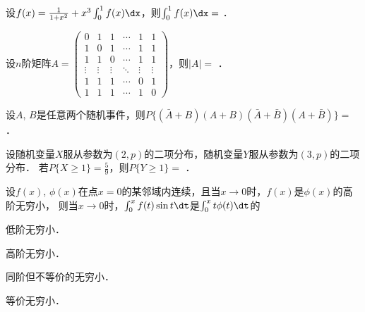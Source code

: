 \documentclass[plain,noanswer,medmath]{../../template/jnuexam}
\begin{document}








\begin{problem}
设$f(x) = \frac{1}{1 + x^2} + x^3\int_0^1f(x)\dx$，则$\int_0^1f(x)\dx =$ \fillin{}．
\end{problem}


\begin{problem}
设$n$阶矩阵$A = \begin{pmatrix}
       0 &      1 &      1 & \cdots &      1 & 1 \\
       1 &      0 &      1 & \cdots &      1 & 1 \\
       1 &      1 &      0 & \cdots &      1 & 1 \\
  \vdots & \vdots & \vdots & \ddots & \vdots & \vdots \\
       1 &      1 &      1 & \cdots &      0 & 1 \\
       1 &      1 &      1 & \cdots &      1 & 0
\end{pmatrix}$，则$|A|=$ \fillin{}．
\end{problem}


\begin{problem}
设$A$, $B$是任意两个随机事件，则$P\{(\bar A + B)(A + B)(\bar A + \bar B)(A + \bar B)\} =$ \fillin{}．
\end{problem}


\begin{problem}
设随机变量$X$服从参数为$(2,p)$的二项分布，随机变量$Y$服从参数为$(3,p)$的二项分布．
若$P\{X \ge 1\} = \frac{5}{9}$，则$P\{Y \ge 1\} =$ \fillin{}．
\end{problem}




\begin{problem}
设$f(x)$, $\phi (x)$在点$x = 0$的某邻域内连续，且当$x \to 0$时，$f(x)$是$\phi (x)$的高阶无穷小，
则当$x \to 0$时，$\int_0^x f(t)\sin t\dt$是$\int_0^x t\phi(t)\dt$的\pickout{}
\begin{abcd}
\item 低阶无穷小．                    
\item 高阶无穷小．
\item 同阶但不等价的无穷小．          
\item 等价无穷小．
\end{abcd}
\end{problem}
\end{document}
